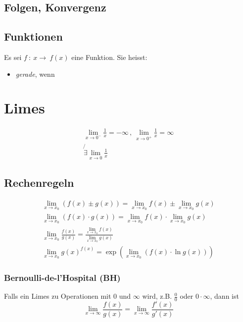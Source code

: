 \documentclass[12pt]{article}
\begin{document}
\begin{multicols*}{3}
			\subsection{Folgen, Konvergenz} %
				
			
			\subsection{Funktionen} %
				
				Es sei $f\ :\ x \to \ f(x)$ eine Funktion. Sie heisst:
				\begin{itemize}
					\item \emph{gerade}, wenn
				\end{itemize}
				
			
		\section{Limes} %
			\begin{gather*}
				\lim_{x \to 0^-} \frac{1}{x} = -\infty \,, \ 
				\lim_{x \to 0^+} \frac{1}{x} = \infty \\
				\not{\exists} \lim_{x \to 0} \frac{1}{x}
			\end{gather*}
			\subsection{Rechenregeln} %
				\begin{gather*}
					\lim_{x \to x_0} (f(x) \pm g(x)) = \lim_{x \to x_0} f(x) \pm \lim_{x \to x_0} g(x) \\
					\lim_{x \to x_0} (f(x) \cdot g(x)) = \lim_{x \to x_0} f(x) \cdot \lim_{x \to x_0} g(x) \\
					\lim_{x \to x_0} \frac{f(x)}{g(x)} = \frac{\lim_{x \to x_0} f(x)}{\lim_{x \to x_0} g(x)} \\
					\lim_{x \to x_0} g(x)^{f(x)} = \exp\left( \lim_{x \to x_0} (f(x) \cdot \ln{g(x)})\right)
				\end{gather*}
				
				\subsubsection{Bernoulli-de-l'Hospital (BH)} %
					Falls ein Limes zu Operationen mit $0$ und $\infty$ wird, z.B. $\frac{0}{0}$ oder $0 \cdot \infty$,
					dann ist
					\[
						\lim_{x \to \infty} \frac{f(x)}{g(x)} = \lim_{x \to \infty} \frac{f'(x)}{g'(x)}
					\]
				

\end{multicols*}
\end{document}

